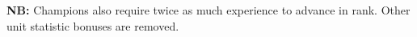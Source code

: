\documentclass{article}
\begin{document}
\textbf{NB:} Champions also require twice as much experience to advance in rank. Other unit statistic bonuses are removed. %

\begin{comment}
\subsubsection{Unit categories}
\begin{tabular}{l|cccccc}
 & {\bf population} & {\bf standard} & {\bf resource} & {\bf worker} & {\bf vision} & {\bf promotion  } \\
 & {\bf slots     } & {\bf food    } & {\bf carry   } & {\bf gather} & {\bf range } & {\bf experience } \\
 & {\bf occupied  } & {\bf cost    } & {\bf capacity} & {\bf rate  } & {(metres)  } & {\bf requirement} \\
\hline
War dogs                        & 0 &  30 & -- &  -- & 60 &  75 \\
Healers                         & 1 &  25 & -- &  -- & 60 & 250 \\
Infantry                        & 1 &  25 & 10 & 1.0 & 75 & 100 \\
Camels                          & 2 &  40 & 40 & 1.8 & 85 & 125 \\
Cavalry                         & 2 &  50 & 30 & 2.0 & 80 & 150 \\
Bigae (two-horse chariots)      & 4 & 100 & 60 & 3.6 & 80 & 200 \\
Quadrigae (four-horse chariots) & 6 & 150 & 60 & 3.6 & 80 & 240 \\
War elephants                   & 6 & 200 & 75 & 3.0 & 90 & 300 \\
\end{tabular}
\subsection{Infantry}
\begin{itemize}
  \item All unit categories inflict bonus damage against at least one unit class;
  \subitem Crush damage soldiers (macemen, slingers) have a 75\% penalty vs structures; Mauryas can construct rams;
  \subitem Archers have a 50\% penalty vs elephants.
\end{itemize}


\end{comment}
\end{document}
